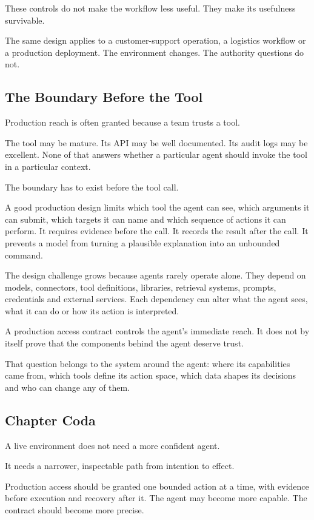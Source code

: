 These controls do not make the workflow less useful. They make its
usefulness survivable.

The same design applies to a customer-support operation, a logistics
workflow or a production deployment. The environment changes. The
authority questions do not.

\subsection{The Boundary Before the
Tool}\label{the-boundary-before-the-tool}

Production reach is often granted because a team trusts a tool.

The tool may be mature. Its API may be well documented. Its audit logs
may be excellent. None of that answers whether a particular agent should
invoke the tool in a particular context.

The boundary has to exist before the tool call.

A good production design limits which tool the agent can see, which
arguments it can submit, which targets it can name and which sequence of
actions it can perform. It requires evidence before the call. It records
the result after the call. It prevents a model from turning a plausible
explanation into an unbounded command.

The design challenge grows because agents rarely operate alone. They
depend on models, connectors, tool definitions, libraries, retrieval
systems, prompts, credentials and external services. Each dependency can
alter what the agent sees, what it can do or how its action is
interpreted.

A production access contract controls the agent's immediate reach. It
does not by itself prove that the components behind the agent deserve
trust.

That question belongs to the system around the agent: where its
capabilities came from, which tools define its action space, which data
shapes its decisions and who can change any of them.

\subsection{Chapter Coda}\label{chapter-coda}

A live environment does not need a more confident agent.

It needs a narrower, inspectable path from intention to effect.

Production access should be granted one bounded action at a time, with
evidence before execution and recovery after it. The agent may become
more capable. The contract should become more precise.


